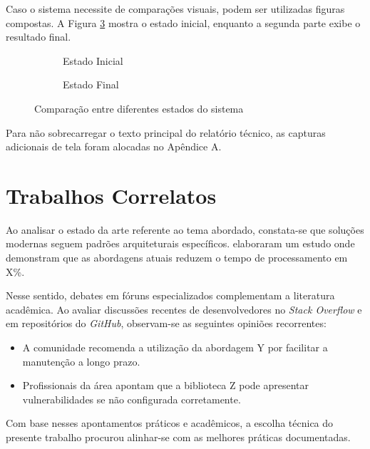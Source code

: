 \documentclass[
    12pt,
    openright,
    oneside,
    a4paper,
    english,
    french,
    spanish,
    brazil
]{abntex2}
\begin{document}
Caso o sistema necessite de comparações visuais, podem ser utilizadas figuras compostas. A Figura \ref{fig:exemplo_composto} mostra o estado inicial, enquanto a segunda parte exibe o resultado final.

\begin{figure}[htb]
    \centering
    \begin{subfigure}[b]{0.45\textwidth}
        \centering
        \fbox{\rule{0pt}{1.5in} \rule{1in}{0pt}} %
        \caption{Estado Inicial}
        \label{fig:composta_a}
    \end{subfigure}
    \hfill
    \begin{subfigure}[b]{0.45\textwidth}
        \centering
        \fbox{\rule{0pt}{1.5in} \rule{1in}{0pt}} %
        \caption{Estado Final}
        \label{fig:composta_b}
    \end{subfigure}
    \caption{Comparação entre diferentes estados do sistema}
    \label{fig:exemplo_composto}
\end{figure}

Para não sobrecarregar o texto principal do relatório técnico, as capturas adicionais de tela foram alocadas no Apêndice A.

\chapter{Trabalhos Correlatos}
Ao analisar o estado da arte referente ao tema abordado, constata-se que soluções modernas seguem padrões arquiteturais específicos.  elaboraram um estudo onde demonstram que as abordagens atuais reduzem o tempo de processamento em X\%.

Nesse sentido, debates em fóruns especializados complementam a literatura acadêmica. Ao avaliar discussões recentes de desenvolvedores no \textit{Stack Overflow} e em repositórios do \textit{GitHub}, observam-se as seguintes opiniões recorrentes:
\begin{itemize}
    \item A comunidade recomenda a utilização da abordagem Y por facilitar a manutenção a longo prazo.
    \item Profissionais da área apontam que a biblioteca Z pode apresentar vulnerabilidades se não configurada corretamente.
\end{itemize}

Com base nesses apontamentos práticos e acadêmicos, a escolha técnica do presente trabalho procurou alinhar-se com as melhores práticas documentadas.
\end{document}
